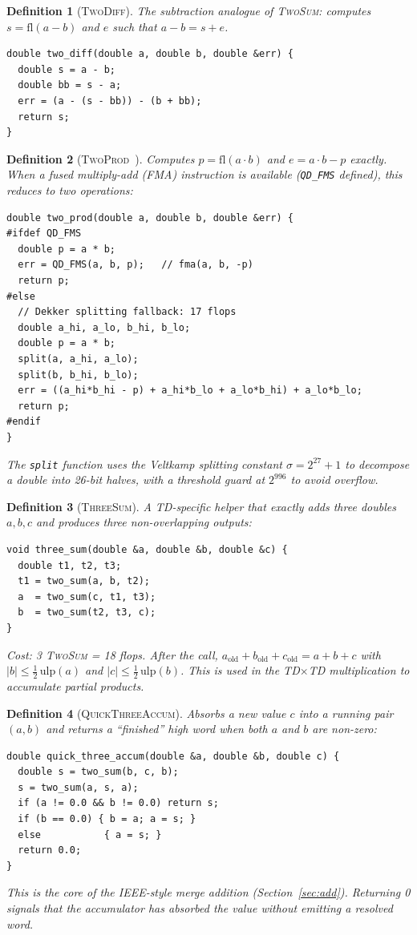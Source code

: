 \documentclass[11pt,a4paper]{article}
\newtheorem{definition}{Definition}
\begin{document}
\begin{definition}[\textsc{TwoDiff}]
The subtraction analogue of \textsc{TwoSum}: computes
$s = \mathrm{fl}(a - b)$ and $e$ such that $a - b = s + e$.
\begin{lstlisting}
double two_diff(double a, double b, double &err) {
  double s = a - b;
  double bb = s - a;
  err = (a - (s - bb)) - (b + bb);
  return s;
}
\end{lstlisting}
\end{definition}

\begin{definition}[\textsc{TwoProd}~{\cite{Dekker1971}}]
Computes $p = \mathrm{fl}(a \cdot b)$ and $e = a \cdot b - p$
exactly.  When a fused multiply-add (FMA) instruction is available
(\texttt{QD\_FMS} defined), this reduces to two operations:
\begin{lstlisting}
double two_prod(double a, double b, double &err) {
#ifdef QD_FMS
  double p = a * b;
  err = QD_FMS(a, b, p);   // fma(a, b, -p)
  return p;
#else
  // Dekker splitting fallback: 17 flops
  double a_hi, a_lo, b_hi, b_lo;
  double p = a * b;
  split(a, a_hi, a_lo);
  split(b, b_hi, b_lo);
  err = ((a_hi*b_hi - p) + a_hi*b_lo + a_lo*b_hi) + a_lo*b_lo;
  return p;
#endif
}
\end{lstlisting}
The \texttt{split} function uses the Veltkamp splitting constant
$\sigma = 2^{27} + 1$ to decompose a double into 26-bit halves,
with a threshold guard at $2^{996}$ to avoid overflow.
\end{definition}

\begin{definition}[\textsc{ThreeSum}]
A TD-specific helper that exactly adds three doubles $a, b, c$ and
produces three non-overlapping outputs:
\begin{lstlisting}
void three_sum(double &a, double &b, double &c) {
  double t1, t2, t3;
  t1 = two_sum(a, b, t2);
  a  = two_sum(c, t1, t3);
  b  = two_sum(t2, t3, c);
}
\end{lstlisting}
Cost: 3 \textsc{TwoSum} = 18 flops.  After the call,
$a_{\text{old}} + b_{\text{old}} + c_{\text{old}} = a + b + c$
with $|b| \le \frac{1}{2}\,\mathrm{ulp}(a)$ and
$|c| \le \frac{1}{2}\,\mathrm{ulp}(b)$.  This is used in the
TD$\times$TD multiplication to accumulate partial products.
\end{definition}

\begin{definition}[\textsc{QuickThreeAccum}]
Absorbs a new value $c$ into a running pair $(a, b)$ and returns
a ``finished'' high word when both $a$ and $b$ are non-zero:
\begin{lstlisting}
double quick_three_accum(double &a, double &b, double c) {
  double s = two_sum(b, c, b);
  s = two_sum(a, s, a);
  if (a != 0.0 && b != 0.0) return s;
  if (b == 0.0) { b = a; a = s; }
  else           { a = s; }
  return 0.0;
}
\end{lstlisting}
This is the core of the IEEE-style merge addition
(Section~\ref{sec:add}).  Returning 0 signals that the accumulator
has absorbed the value without emitting a resolved word.
\end{definition}
\end{document}
